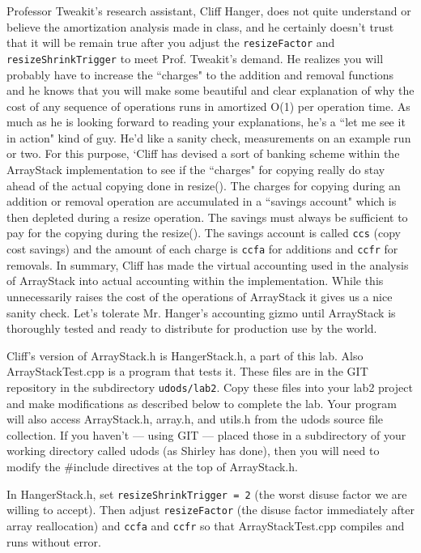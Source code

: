 \documentclass[]{article}
\begin{document}
Professor Tweakit's research assistant, Cliff Hanger, does not quite understand or believe the amortization analysis made in class, and he certainly doesn't trust that it will be remain true after you adjust the \verb|resizeFactor| and \verb|resizeShrinkTrigger| to meet Prof. Tweakit's demand.  
He realizes you will probably have to increase the ``charges" to the addition and removal functions and he knows that you will make some beautiful and clear explanation of why the cost of any sequence of operations runs in amortized O(1) per operation time.  As much as he is looking forward to reading your explanations, he's a ``let me see it in action" kind of guy.  He'd like a sanity check, measurements on an example run or two.  For this purpose, `Cliff has devised a sort of banking scheme within the ArrayStack implementation to see if the ``charges" for copying really do stay ahead of the actual copying done in resize().   The charges for copying during an addition or removal operation are accumulated in a ``savings account" which is then depleted during a resize operation.  The savings must always be sufficient to pay for the copying during the resize().
The savings account is called \verb|ccs| (copy cost savings) and the amount of each charge is \verb|ccfa| for additions and \verb|ccfr| for removals.
In summary, Cliff has made the virtual accounting used in the analysis of ArrayStack into actual accounting within the implementation.  While this unnecessarily raises the cost of the operations of ArrayStack it gives us a nice sanity check.  Let's tolerate Mr. Hanger's accounting gizmo until ArrayStack is thoroughly tested and ready to distribute for production use by the world.

Cliff's version of ArrayStack.h is HangerStack.h, a part of this lab.  Also ArrayStackTest.cpp is a program that 
tests it.  These files are in the GIT repository in the subdirectory \verb|udods/lab2|.  Copy these files into your lab2 project and make modifications as described below to complete the lab.  
Your program will also access ArrayStack.h, array.h, and utils.h from the udods source file collection.  If you haven't --- using GIT --- placed those in a subdirectory of your working directory called udods (as Shirley has done), then you will need to modify the \#include directives at the top of ArrayStack.h.



In HangerStack.h, set \verb|resizeShrinkTrigger = 2| (the worst disuse factor we are willing to accept).
Then adjust \verb|resizeFactor| (the disuse factor immediately after array reallocation) and \verb|ccfa| and \verb|ccfr| so that ArrayStackTest.cpp compiles and runs without error.
\end{document}
